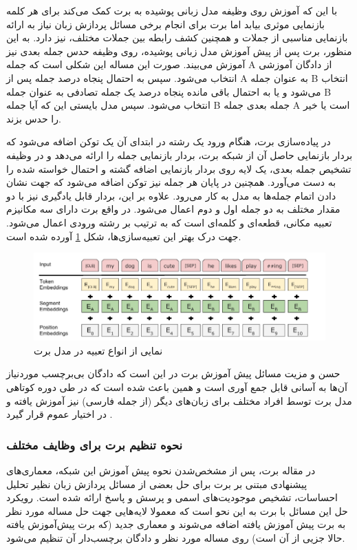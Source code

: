 با این که آموزش روی وظیفه مدل زبانی پوشیده به برت کمک می‌کند برای هر کلمه بازنمایی موثری بیابد اما برت برای انجام برخی مسائل پردازش زبان نیاز به ارائه بازنمایی مناسبی از جملات
و همچنین کشف رابطه بین جملات مختلف،
 نیز دارد. به این منظور، برت پس از پیش آموزش مدل زبانی پوشیده، روی وظیفه حدس جمله بعدی نیز آموزش می‌بیند. صورت این مساله این شکلی است که جمله A از دادگان آموزشی انتخاب می‌شود. سپس به احتمال پنجاه درصد جمله پس از A به عنوان جمله B انتخاب می‌شود و یا به احتمال باقی مانده پنجاه درصد یک جمله تصادفی به عنوان جمله B انتخاب می‌شود. سپس مدل بایستی این که آیا جمله B جمله بعدی جمله A است یا خیر را حدس بزند. 

 در پیاده‌سازی برت، هنگام ورود یک رشته در ابتدای آن یک توکن
\lr{[CLS]}
اضافه می‌شود که بردار بازنمایی حاصل آن از شبکه برت، بردار بازنمایی جمله را ارائه می‌دهد و در وظیفه تشخیص جمله بعدی، یک لایه
روی بردار بازنمایی
\lr{[CLS]}
اضافه گشته و احتمال خواسته شده را به دست می‌آورد. همچنین در پایان هر جمله نیز توکن
\lr{[SEP]}
اضافه می‌شود که جهت نشان دادن اتمام جمله‌ها به مدل به کار می‌رود. علاوه بر این، بردار
قابل یادگیری نیز با دو مقدار مختلف به دو جمله اول و دوم اعمال می‌شود. در واقع برت دارای سه مکانیزم تعبیه مکانی، قطعه‌ای و کلمه‌ای است که به ترتیب بر رشته ورودی اعمال می‌شود. جهت درک بهتر این تعبیه‌سازی‌ها، شکل
\ref{fig:chap3:bert_embeddings}
 آورده شده است.

 \begin{figure}[h]
 	\centering
 	\includegraphics[width=1\textwidth]{images/chap3/bert_embeddings.png}
 	\caption[نمایی از انواع تعبیه در مدل برت]
 	{
 		نمایی از انواع تعبیه در مدل برت
 		\cite{bert}
 	}
 	\label{fig:chap3:bert_embeddings}
 \end{figure}

حسن و مزیت مسائل پیش آموزش برت در این است که دادگان بی‌برچسب موردنیاز آن‌ها به آسانی قابل جمع آوری است و همین باعث شده است که در طی دوره کوتاهی مدل برت 
توسط افراد مختلف
برای زبان‌های دیگر (از جمله فارسی) نیز آموزش یافته و در اختیار عموم قرار گیرد
\cite{parsbert}.

\subsubsection{نحوه تنظیم برت برای وظایف مختلف}
در مقاله برت،‌ پس از مشخص‌شدن نحوه پیش آموزش این شبکه، معماری‌های پیشنهادی مبتنی بر برت برای حل بعضی از مسائل پردازش زبان نظیر تحلیل احساسات، تشخیص موجودیت‌های اسمی و پرسش و پاسخ ارائه شده است. رویکرد حل این مسائل با برت به این نحو است که معمولا لایه‌هایی جهت حل مساله مورد نظر به برت پیش آموزش یافته اضافه می‌شوند و معماری جدید (که برت پیش‌آموزش یافته حالا جزیی از آن است) روی مساله مورد نظر و دادگان برچسب‌دار آن تنظیم می‌شود. 


